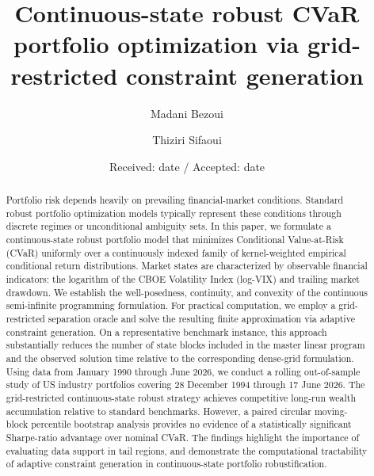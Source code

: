 \documentclass[smallextended]{svjour3}
\begin{document}
\title{Continuous-state robust CVaR portfolio optimization via grid-restricted constraint generation}

\author{Madani Bezoui \and Thiziri Sifaoui}


\date{Received: date / Accepted: date}

\maketitle

\begin{abstract}
Portfolio risk depends heavily on prevailing financial-market conditions. Standard robust portfolio optimization models typically represent these conditions through discrete regimes or unconditional ambiguity sets. In this paper, we formulate a continuous-state robust portfolio model that minimizes Conditional Value-at-Risk (CVaR) uniformly over a continuously indexed family of kernel-weighted empirical conditional return distributions. Market states are characterized by observable financial indicators: the logarithm of the CBOE Volatility Index (log-VIX) and trailing market drawdown. We establish the well-posedness, continuity, and convexity of the continuous semi-infinite programming formulation. For practical computation, we employ a grid-restricted separation oracle
and solve the resulting finite approximation via adaptive constraint
generation. On a representative benchmark instance, this approach
substantially reduces the number of state blocks included in the master
linear program and the observed solution time relative to the corresponding
dense-grid formulation. Using data from January 1990 through June 2026, we conduct a rolling
out-of-sample study of US industry portfolios covering 28 December 1994
through 17 June 2026. The grid-restricted continuous-state robust strategy achieves competitive long-run wealth accumulation relative to standard benchmarks. However, a paired circular moving-block percentile bootstrap analysis provides no evidence of a statistically significant Sharpe-ratio advantage over nominal CVaR. The findings highlight the importance of evaluating data support in tail regions, and demonstrate the computational tractability of adaptive constraint generation in continuous-state portfolio robustification.
\end{abstract}
\end{document}
